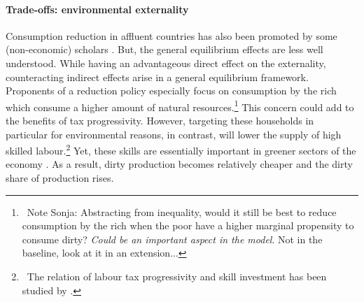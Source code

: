 % 


\paragraph{Trade-offs: environmental externality} Consumption reduction in affluent countries has also been promoted by some (non-economic) scholars \citep{Schor2005SustainableReduction, Pullinger2014WorkingDesign, Arrow2004AreMuch}. But, the general equilibrium effects are less well understood.
While having an advantageous direct effect on the externality, counteracting indirect effects arise in a general equilibrium framework. Proponents of a reduction policy especially focus on consumption by the rich which consume a higher amount of natural resources.\footnote{\ Note Sonja: Abstracting from inequality, would it still be best to reduce consumption by the rich when the poor have a higher marginal propensity to consume dirty? \textit{Could be an important aspect in the model}. Not in the baseline, look at it in an extension...}
This concern could add to the benefits of tax progressivity.
However, targeting these households in particular for environmental reasons, in contrast, will lower the supply of high skilled labour.\footnote{\ The relation of labour tax progressivity and skill investment has been studied by \cite{Heathcote2017OptimalFramework}.} Yet, these skills are essentially important in greener sectors of the economy \citep{Consoli2016DoCapital}. As a result, dirty production becomes relatively cheaper and the dirty share of production rises. 

